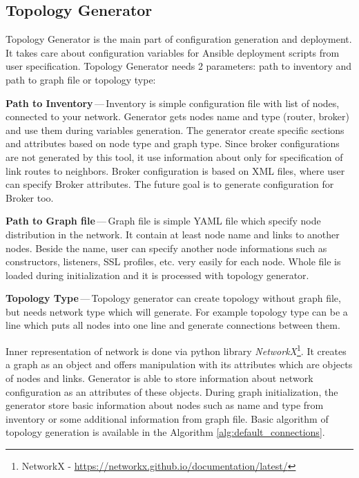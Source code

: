 \subsection{Topology Generator}
Topology Generator is the main part of configuration generation and deployment. It takes care about configuration variables for Ansible deployment scripts from user specification. Topology Generator needs 2 parameters: path to inventory and path to graph file or topology type:

\begin{description}
	\item \textbf{Path to Inventory}\,---\,Inventory is simple configuration file with list of nodes, connected to your network. Generator gets nodes name and type (router, broker) and use them during variables generation. The generator create specific sections and attributes based on node type and graph type. Since broker configurations are not generated by this tool, it use information about only for specification of link routes to neighbors. Broker configuration is based on XML files, where user can specify Broker attributes. The future goal is to generate configuration for Broker too.
	\item \textbf{Path to Graph file}\,---\,Graph file is simple YAML file which specify node distribution in the network. It contain at least node name and links to another nodes. Beside the name, user can specify another node informations such as constructors, listeners, SSL profiles, etc. very easily for each node. Whole file is loaded during initialization and it is processed with topology generator.
	\item \textbf{Topology Type}\,---\,Topology generator can create topology without graph file, but needs network type which will generate. For example topology type can be a line which puts all nodes into one line and generate connections between them.
\end{description}

Inner representation of network is done via python library \emph{NetworkX}\footnote{NetworkX - \url{https://networkx.github.io/documentation/latest/}}. It creates a graph as an object and offers manipulation with its attributes which are objects of nodes and links. Generator is able to store information about network configuration as an attributes of these objects. During graph initialization, the generator store basic information about nodes such as name and type from inventory or some additional information from graph file. Basic algorithm of topology generation is available in the Algorithm \ref{alg:default_connections}.

